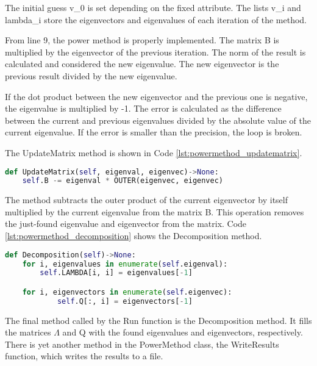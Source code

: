 The initial guess v\_0 is set depending on the fixed attribute. The lists v\_i and lambda\_i store the eigenvectors and eigenvalues of each iteration of the method. 

From line 9, the power method is properly implemented. The matrix B is multiplied by the eigenvector of the previous iteration. The norm of the result is calculated and considered the new eigenvalue. The new eigenvector is the previous result divided by the new eigenvalue. 

If the dot product between the new eigenvector and the previous one is negative, the eigenvalue is multiplied by -1. The error is calculated as the difference between the current and previous eigenvalues divided by the absolute value of the current eigenvalue. If the error is smaller than the precision, the loop is broken.

The UpdateMatrix method is shown in Code \ref{lst:powermethod_updatematrix}.
\begin{lstlisting}[caption={PowerMethod UpdateMatrix method}, label={lst:powermethod_updatematrix}, language=python]
def UpdateMatrix(self, eigenval, eigenvec)->None:
    self.B -= eigenval * OUTER(eigenvec, eigenvec)
\end{lstlisting}

The method subtracts the outer product of the current eigenvector by itself multiplied by the current eigenvalue from the matrix B. This operation removes the just-found eigenvalue and eigenvector from the matrix. Code \ref{lst:powermethod_decomposition} shows the Decomposition method.
\begin{lstlisting}[caption={PowerMethod Decomposition method}, label={lst:powermethod_decomposition}, language=python]
def Decomposition(self)->None:
    for i, eigenvalues in enumerate(self.eigenval):
        self.LAMBDA[i, i] = eigenvalues[-1]

    for i, eigenvectors in enumerate(self.eigenvec):
            self.Q[:, i] = eigenvectors[-1]
\end{lstlisting}

The final method called by the Run function is the Decomposition method. It fills the matrices $\Lambda$ and Q with the found eigenvalues and eigenvectors, respectively. There is yet another method in the PowerMethod class, the WriteResults function, which writes the results to a file. 


